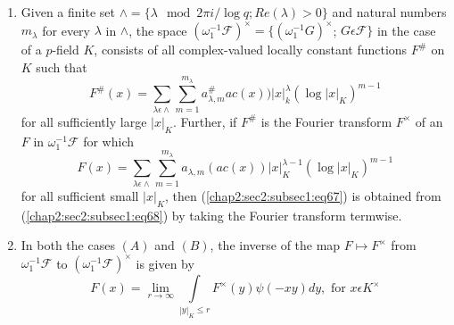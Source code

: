 \begin{enumerate}
\item Given a finite set $\wedge=\{\lambda \mod 2\pi i/\log q;
  Re(\lambda)>0\}$ and natural numbers $m_{\lambda}$ for every
  $\lambda$ in $\wedge$, the space
  $(\omega_{1}^{-1}\mathscr{F})^{\times}=\{(\omega_{1}^{-1}G)^{\times}$;
  $G\epsilon
  \mathscr{F}\}$ in the case of a $p$-field $K$, consists of all
  complex-valued locally constant functions $F^{\#}$ on $K$ such that
\begin{equation*}
  F^{\#}(x)=\sum\limits_{\lambda \epsilon \wedge}
  \sum\limits_{m=1}^{m_{\lambda}}a_{\lambda,m}^{\#}ac(x))
  |x|_{k}^{\lambda}(\log|x|_{K})^{m-1}\tag{67}\label{chap2:sec2:subsec1:eq67}
\end{equation*}
for all sufficiently large $|x|_{K}$. Further, if $F^{\#}$ is the
Fourier transform $F^{\times}$ of an $F$ in $\omega_{1}^{-1}\mathscr{F}$
for which
\begin{equation*}
F(x)=\sum\limits_{\lambda \epsilon
  \wedge}\sum\limits_{m=1}^{m_{\lambda}}a_{\lambda,
  m}(ac(x))|x|_{K}^{\lambda-1}(\log
|x|_{K})^{m-1}\tag{68}\label{chap2:sec2:subsec1:eq68} 
\end{equation*}
 for all sufficient small $|x|_{K}$, then
 (\ref{chap2:sec2:subsec1:eq67}) is obtained from 
 (\ref{chap2:sec2:subsec1:eq68}) by taking the  Fourier transform termwise.
\item In both the cases $(A)$ and $(B)$, the inverse of the map
  $F\mapsto F^{\times}$ from  $\omega_{1}^{-1}\mathscr{F}$ to
  $(\omega_{1}^{-1}\mathscr{F})^{\times}$ is given by
\begin{equation*}
  F(x)=\lim\limits_{r\rightarrow \infty}\int\limits_{|y|_{K}\le r}
  F^{\times}(y)\psi(-xy)dy, \text{ for } x\epsilon K^{\times}
  \tag{69}\label{chap2:sec2:subsec1:eq69} 
\end{equation*}
\end{enumerate}

